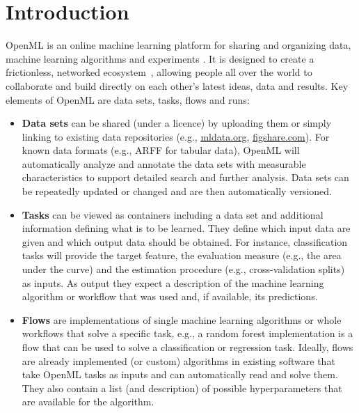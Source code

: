 \section{Introduction}
\label{sec:introduction}

OpenML is an online machine learning platform for sharing and organizing data,
machine learning algorithms and experiments \citep{openml2013}. It is designed to
create a frictionless, networked ecosystem~\citep{nielsen2012reinventing}, allowing people all over the world to collaborate and build directly on each
other's latest ideas, data and results. Key elements of OpenML are data sets,
tasks, flows and runs:

\begin{itemize}
\item \textbf{Data sets} can be shared (under a licence) by uploading them or simply linking to existing data repositories (e.g., \href{http://mldata.org}{mldata.org}, \href{https://figshare.com}{figshare.com}).
For known data formats (e.g., ARFF for tabular data), OpenML will automatically
analyze and annotate the data sets with measurable characteristics to support detailed search and further analysis.
Data sets can be repeatedly updated or changed and are then automatically versioned.

\item \textbf{Tasks} can be viewed as containers including a data set and additional information defining what is to be learned. They define which input data
are given and which output data should be obtained. For instance, classification
tasks will provide the target feature, the evaluation measure (e.g., the area under the curve) and the estimation procedure (e.g., cross-validation splits) as inputs. As output they expect a
description of the machine learning algorithm or workflow that was used and, if available, its predictions.

\item \textbf{Flows} are implementations of single machine learning algorithms
or whole workflows that solve a specific task, e.g., a random forest 
implementation is a flow that can be used
to solve a classification or regression task. 
Ideally, flows are already implemented (or custom) algorithms in existing software that 
take OpenML tasks as inputs and can automatically read and solve them.
They also contain a list (and description) of possible hyperparameters that are available for the algorithm.


\end{itemize}
